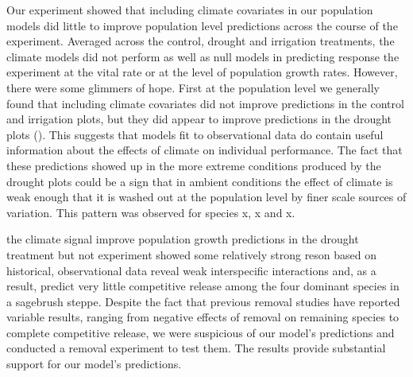\documentclass[11pt]{article}
\begin{document}
\begin{doublespacing}
{Our experiment showed that including climate covariates in our population models did little to improve population level predictions across the course of the experiment.  Averaged across the control, drought and irrigation treatments, the climate models did not perform as well as null models in predicting response the experiment at the vital rate or at the level of population growth rates.  However, there were some glimmers of hope.  First at the population level we generally found that including climate covariates did not improve predictions in the control and irrigation plots, but they did appear to improve predictions in the drought plots ().  This suggests that models fit to observational data do contain useful information about the effects of climate on individual performance.  The fact that these predictions showed up in the more extreme conditions produced by the drought plots could be a sign that in ambient conditions the effect of climate is weak enough that it is washed out at the population level by finer scale sources of variation. This pattern was observed for species x, x and x.

 the climate signal  improve population growth predictions in the drought treatment but not experiment showed some relatively strong reson based on historical, observational data reveal weak interspecific interactions \citep{adler_coexistence_2010,chu_large_2015} and, as a result, predict very little competitive release among the four dominant species in a sagebrush steppe. Despite the fact that previous removal studies have reported variable results, ranging from negative effects of removal on remaining species to complete competitive release, we were suspicious of our model's predictions and conducted a removal experiment to test them. The results provide substantial support for our model's predictions.

}
\end{doublespacing}
\end{document}
